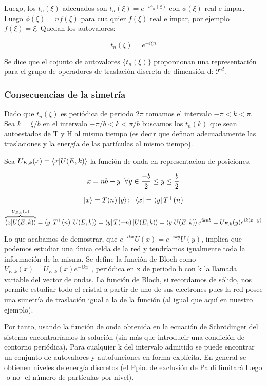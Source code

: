 \documentclass{article}
\begin{document}
Luego, los $t_n(\xi)$ adecuados son $ t_n(\xi)=e^{-i\phi _n(\xi)}$ con $\phi (\xi)$ real e impar. Luego $\phi (\xi)=nf(\xi)$ para cualquier $f(\xi)$ real e impar, por ejemplo $f(\xi)=\xi$. Quedan los autovalores:

$$t_n(\xi)=e^{-i\xi n}$$

Se dice que el cojunto de autovalores $\lbrace t_n(\xi) \rbrace$ proporcionan una representación para el grupo de operadores de traslación discreta de dimensión d: $\mathcal{T}^d$.

\subsubsection{Consecuencias de la simetría}
Dado que $t_n(\xi)$ es periódica de periodo $2\pi$  tomamos el intervalo $-\pi <k<\pi$. Sea $k=\xi/b$ en el intervalo $-\pi/b<k<\pi/b$ buscamos los $t_n(k)$ que sean autoestados de T y H al mismo tiempo (es decir que definan adecuadamente las traslaciones y la energía de las partículas al mismo tiempo).

\smallskip
Sea $U_{E,k}(x)=\braket{x|U(E,k)}$ la función de onda en representacion de posiciones.

$$x=nb+y \hspace{0.2cm} \forall y \in \frac{-b}{2}\leq y \leq \frac{b}{2}$$

$$\ket{x}=T(n)\ket{y}; \hspace{0.2cm}\bra{x}=\bra{y}T^+(n)$$
$$\overbrace{\braket{x|U(E,k)}}^{U_{E,k}(x)}=\bra{y}T^+(n)\ket{U(E,k)}=\bra{y}T(-n)\ket{U(E,k)}=\braket{y|U(E,k)}e^{iknb}=U_{E,k}(y)e^{ik(x-y)}$$

Lo que acabamos de demostrar, que $e^{-ikx}U(x)=e^{-iky}U(y)$, implica que podemos estudiar una única celda de la red y tendríamos igualmente toda la información de la misma. Se define la función de Bloch como $V_{E,k}(x)=U_{E,k}(x)e^{-ikx}$ , periódica en x de periodo b con k la llamada variable del vector de ondas. La función de Bloch, si recordamos de sólido, nos permite estudiar todo el cristal a partir de uno de sus electrones pues la red posee una simetría de traslación igual a la de la función (al igual que aquí en nuestro ejemplo).
\newpage

Por tanto, usando la función de onda obtenida en la ecuación de Schrödinger del sistema encontraríamos la solución (sin más que introducir una condición de contorno periódica). Para cualquier k del intervalo admitido se puede encontrar un conjunto de autovalores y autofunciones en forma explícita. En general se obtienen niveles de energía discretos (el Ppio. de exclusión de Pauli limitará luego -o no- el número de partículas por nivel).
\end{document}
